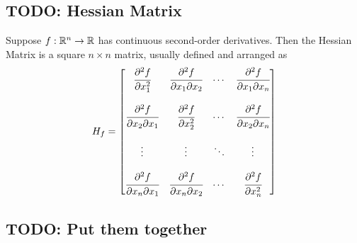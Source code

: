     \subsection{TODO: Hessian Matrix}
    \begin{Def}
        Suppose $f: \mathbb{R}^n \to \mathbb{R}$ has continuous second-order derivatives. Then the Hessian Matrix is a square $n\times n$ matrix, usually defined and arranged as
        \begin{equation}
            H_f = \begin{bmatrix}
            \cfrac{\partial^2 f}{\partial x_1^2} & \cfrac{\partial^2 f}{\partial x_1 \partial x_2} & \cdots & \cfrac{\partial^2 f}{\partial x_1 \partial x_n} \\\\
            \cfrac{\partial^2 f}{\partial x_2 \partial x_1} & \cfrac{\partial^2 f}{\partial x_2^2} & \cdots & \cfrac{\partial^2 f}{\partial x_2 \partial x_n} \\\\
            \vdots & \vdots & \ddots & \vdots \\\\
            \cfrac{\partial^2 f}{\partial x_n \partial x_1} & \cfrac{\partial^2 f}{\partial x_n \partial x_2} & \cdots & \cfrac{\partial^2 f}{\partial x_n^2}
            \end{bmatrix}
        \end{equation}
    \end{Def}
    \subsection{TODO: Put them together}